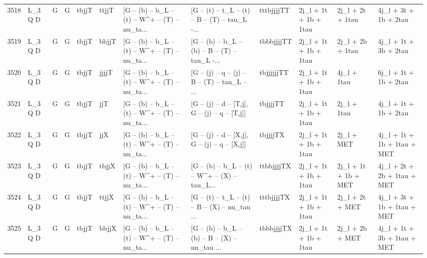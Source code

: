 \begin{tabular}{llllllllllll}
3518 &      L\_3 Q D &     G &     G &       tbjjT &       ttjjT &  [G -- (b) -- b\_L -- (t) -- W\textasciicircum + -- (T) -- nu\_ta... &  [G -- (t) -- t\_L -- (t) -- B -- (T) -- tau\_L -... &  tttbjjjjTT &    2j\_l + 1t + 1b + 1tau &         2j\_l + 2t + 1tau &              4j\_l + 3t + 1b + 2tau \\
3519 &      L\_3 Q D &     G &     G &       tbjjT &       bbjjT &  [G -- (b) -- b\_L -- (t) -- W\textasciicircum + -- (T) -- nu\_ta... &  [G -- (b) -- b\_L -- (b) -- B -- (T) -- tau\_L -... &  tbbbjjjjTT &    2j\_l + 1t + 1b + 1tau &         2j\_l + 2b + 1tau &              4j\_l + 1t + 3b + 2tau \\
3520 &      L\_3 Q D &     G &     G &       tbjjT &       jjjjT &  [G -- (b) -- b\_L -- (t) -- W\textasciicircum + -- (T) -- nu\_ta... &  [G -- (j) -- q -- (j) -- B -- (T) -- tau\_L -- ... &  tbjjjjjjTT &    2j\_l + 1t + 1b + 1tau &              4j\_l + 1tau &              6j\_l + 1t + 1b + 2tau \\
3521 &      L\_3 Q D &     G &     G &       tbjjT &         jjT &  [G -- (b) -- b\_L -- (t) -- W\textasciicircum + -- (T) -- nu\_ta... &   [G -- (j) -- d -- [T,j], G -- (j) -- q -- [T,j]] &    tbjjjjTT &    2j\_l + 1t + 1b + 1tau &              2j\_l + 1tau &              4j\_l + 1t + 1b + 2tau \\
3522 &      L\_3 Q D &     G &     G &       tbjjT &         jjX &  [G -- (b) -- b\_L -- (t) -- W\textasciicircum + -- (T) -- nu\_ta... &   [G -- (j) -- d -- [X,j], G -- (j) -- q -- [X,j]] &    tbjjjjTX &    2j\_l + 1t + 1b + 1tau &               2j\_l + MET &        4j\_l + 1t + 1b + 1tau + MET \\
3523 &      L\_3 Q D &     G &     G &       tbjjT &       tbjjX &  [G -- (b) -- b\_L -- (t) -- W\textasciicircum + -- (T) -- nu\_ta... &  [G -- (b) -- b\_L -- (t) -- W\textasciicircum + -- (X) -- tau\_L... &  ttbbjjjjTX &    2j\_l + 1t + 1b + 1tau &     2j\_l + 1t + 1b + MET &        4j\_l + 2t + 2b + 1tau + MET \\
3524 &      L\_3 Q D &     G &     G &       tbjjT &       ttjjX &  [G -- (b) -- b\_L -- (t) -- W\textasciicircum + -- (T) -- nu\_ta... &  [G -- (t) -- t\_L -- (t) -- B -- (X) -- nu\_tau ... &  tttbjjjjTX &    2j\_l + 1t + 1b + 1tau &          2j\_l + 2t + MET &        4j\_l + 3t + 1b + 1tau + MET \\
3525 &      L\_3 Q D &     G &     G &       tbjjT &       bbjjX &  [G -- (b) -- b\_L -- (t) -- W\textasciicircum + -- (T) -- nu\_ta... &  [G -- (b) -- b\_L -- (b) -- B -- (X) -- nu\_tau ... &  tbbbjjjjTX &    2j\_l + 1t + 1b + 1tau &          2j\_l + 2b + MET &        4j\_l + 1t + 3b + 1tau + MET \\

\end{tabular}
